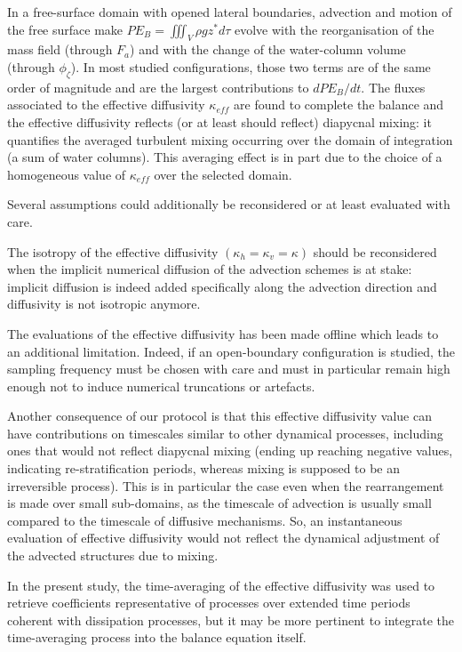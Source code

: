 In a free-surface domain with opened lateral boundaries, advection and motion of the free surface make $PE_B=\iiint_V \rho g z^* d\tau$ evolve with the reorganisation of the mass field (through $F_a$) and with the change of the water-column volume (through $\phi_{\zeta}$). In most studied configurations, those two terms are of the same order of magnitude and are the largest contributions to $dPE_B/dt$. The fluxes associated to the effective diffusivity $\kappa_{eff}$ are found to complete the balance and the effective diffusivity reflects (or at least should reflect) diapycnal mixing: it quantifies the averaged turbulent mixing occurring over the domain of integration (a sum of water columns). 
This averaging effect is in part due to the choice of a homogeneous value of $\kappa_{eff}$ over the selected domain. 

Several assumptions could additionally be reconsidered or at least evaluated with care.

The isotropy of the effective diffusivity $(\kappa_h=\kappa_v=\kappa)$ should be reconsidered when the implicit numerical diffusion of the advection schemes is at stake: implicit diffusion is indeed added specifically along the advection direction and diffusivity is not isotropic anymore.

The evaluations of the effective diffusivity has been made offline which leads to an additional limitation. Indeed, if an open-boundary configuration is studied, the sampling frequency must be chosen with care and must in particular remain high enough not to induce numerical truncations or artefacts.


Another consequence of our protocol is that this effective diffusivity value can have contributions on timescales similar to other dynamical processes, including ones that would not reflect diapycnal mixing (ending up reaching negative values, indicating re-stratification periods, whereas mixing is supposed to be an irreversible process). This is in particular the case even when the rearrangement is made over small sub-domains, as the timescale of advection is usually small compared to the timescale of diffusive mechanisms. So, an instantaneous evaluation of effective diffusivity would not reflect the dynamical adjustment of the advected structures due to mixing.

In the present study, the time-averaging of the effective diffusivity was used to retrieve coefficients representative of processes over extended time periods coherent with dissipation processes, but it may be more pertinent to integrate the time-averaging process into the balance equation itself.

